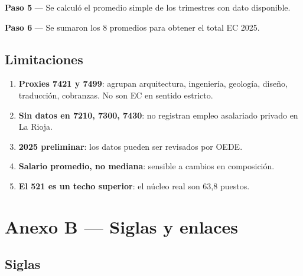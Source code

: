 \documentclass[
  spanish,
  letterpaper,
  DIV=11,
  numbers=noendperiod]{scrartcl}
\begin{document}
\textbf{Paso 5} --- Se calculó el promedio simple de los trimestres con
dato disponible.

\textbf{Paso 6} --- Se sumaron los 8 promedios para obtener el total EC
2025.

\subsection{Limitaciones}\label{limitaciones}

\begin{enumerate}
\def\labelenumi{\arabic{enumi}.}
\item
  \textbf{Proxies 7421 y 7499}: agrupan arquitectura, ingeniería,
  geología, diseño, traducción, cobranzas. No son EC en sentido
  estricto.
\item
  \textbf{Sin datos en 7210, 7300, 7430}: no registran empleo asalariado
  privado en La Rioja.
\item
  \textbf{2025 preliminar}: los datos pueden ser revisados por OEDE.
\item
  \textbf{Salario promedio, no mediana}: sensible a cambios en
  composición.
\item
  \textbf{El 521 es un techo superior}: el núcleo real son 63,8 puestos.
\end{enumerate}

\section{Anexo B --- Siglas y enlaces}\label{sec-siglas}

\subsection{Siglas}\label{siglas}
\end{document}
